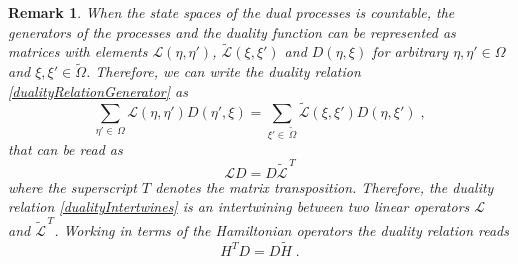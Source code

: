\documentclass[10pt]{article}
\numberwithin{equation}{section}
\numberwithin{equation}{subsection}
\newtheorem{remark}{Remark}
\newcommand{\co}{\;,}
\newcommand{\dt}{\;.}
\begin{document}
\begin{remark}
When the state spaces of the dual processes is countable, the generators of the processes and the duality function can be represented as matrices with elements $\mathcal{L}(\eta,\eta')$, $\widetilde{\mathcal{L}}(\xi,\xi')$ and $D(\eta,\xi)$ for arbitrary $\eta,\eta'\in\Omega$ and $\xi,\xi'\in \widetilde{\Omega}$. Therefore, we can write the duality relation \eqref{dualityRelationGenerator} as 
\begin{equation}
    \sum_{\eta'\in\,\Omega}\mathcal{L}(\eta,\eta')D(\eta',\xi)=\sum_{\xi'\in\, \widetilde{\Omega}}\widetilde{\mathcal{L}}(\xi,\xi')D(\eta,\xi')\co
\end{equation}
that can be read as
\begin{equation}\label{dualityIntertwines}
    \mathcal{L}D=D\widetilde{\mathcal{L}}^{\,T}
\end{equation}
where the superscript $T$ denotes the matrix transposition. Therefore, the duality relation \eqref{dualityIntertwines} is an intertwining between two linear operators $\mathcal{L}$ and $\widetilde{\mathcal{L}}^{\,T}$. Working in terms of the Hamiltonian operators the duality relation reads 
\begin{equation}\label{DualityRelation}
    H^{T}D=D\widetilde{H}\dt
\end{equation}
\end{remark}
\end{document}
